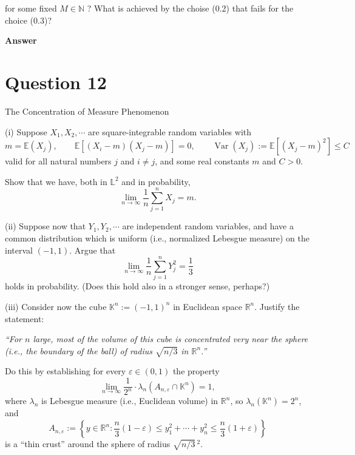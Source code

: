 \documentclass[letterpaper]{article}
\begin{document}
		
		for some fixed $M \in \mathbb{N}$ ? What is achieved by the choise (0.2) that fails for the choice (0.3)?

		\textbf{Answer}
		
		\clearpage
		
		\section{Question 12}
		
		{\color{deepred} The Concentration of Measure Phenomenon}
		
		(i) Suppose $X_1,X_2,\cdots$ are square-integrable random variables with
		\[
		m=\mathbb{E}(X_j), 
		\qquad 
		\mathbb{E}\!\left[(X_i-m)(X_j-m)\right]=0,
		\qquad 
		\operatorname{Var}(X_j):=\mathbb{E}\!\left[(X_j-m)^2\right]\le C
		\]
		valid for all natural numbers $j$ and $i\ne j$, and some real constants $m$ and $C>0$.
		
		Show that we have, both in $\mathbb{L}^2$ and in probability,
		\begin{equation*}
			\lim_{n\to\infty}\frac{1}{n}\sum_{j=1}^n X_j = m.
			\tag{0.4}
		\end{equation*}
		
		(ii) Suppose now that $Y_1,Y_2,\cdots$ are independent random variables, and have a common distribution which is uniform (i.e., normalized Lebesgue measure) on the interval $(-1,1)$. Argue that
		\begin{equation*}
			\lim_{n\to\infty}\frac{1}{n}\sum_{j=1}^n Y_j^2 = \frac{1}{3}
			\tag{0.5}
		\end{equation*}
		holds in probability. (Does this hold also in a stronger sense, perhaps?)
		
		(iii) Consider now the cube $\mathbb{K}^n := (-1,1)^n$ in Euclidean space $\mathbb{R}^n$. Justify the statement:
		
		\emph{``For $n$ large, most of the volume of this cube is concentrated very near the sphere (i.e., the boundary of the ball) of radius $\sqrt{n/3}$ in $\mathbb{R}^n$.''}
		
		Do this by establishing for every $\varepsilon\in(0,1)$ the property
		\begin{equation*}
			\lim_{n\to\infty} \frac{1}{2^n}\cdot \lambda_n\!\left(A_{n,\varepsilon}\cap \mathbb{K}^n\right)=1,
			\tag{0.6}
		\end{equation*}
		where $\lambda_n$ is Lebesgue measure (i.e., Euclidean volume) in $\mathbb{R}^n$, so $\lambda_n(\mathbb{K}^n)=2^n$, and
		\begin{equation*}
			A_{n,\varepsilon}
			:=
			\left\{
			y\in\mathbb{R}^n:
			\frac{n}{3}(1-\varepsilon)
			\le
			y_1^2+\cdots+y_n^2
			\le
			\frac{n}{3}(1+\varepsilon)
			\right\}
			\tag{0.7}
		\end{equation*}
		is a ``thin crust'' around the sphere of radius $\sqrt{n/3}\,^{2}$.
		
\end{document}
